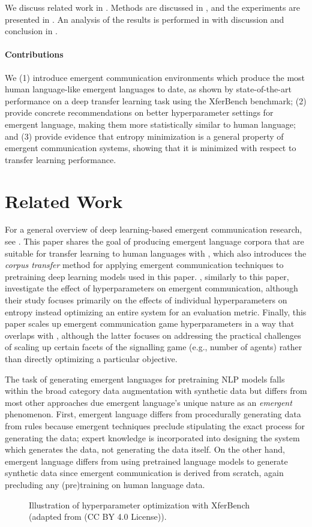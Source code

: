 We discuss related work in .
Methods are discussed in , and the experiments are presented in .
An analysis of the results is performed in  with discussion and conclusion in .

\paragraph{Contributions}

We (1) introduce emergent communication environments which produce the most human language-like emergent languages to date, as shown by state-of-the-art performance on a deep transfer learning task using the XferBench benchmark;
(2) provide concrete recommendations on better hyperparameter settings for emergent language, making them more statistically similar to human language; and
(3) provide evidence that entropy minimization is a general property of emergent communication systems, showing that it is minimized with respect to transfer learning performance.


\section{Related Work}
\unskip\label{hpo:sec:related-work}
For a general overview of deep learning-based emergent communication research, see \citet{lazaridou2020emergentmultiagentcommunicationdeep}.
This paper shares the goal of producing emergent language corpora that are suitable for transfer learning to human languages with \citet{yao2022linking}, which also introduces the \emph{corpus transfer} method for applying emergent communication techniques to pretraining deep learning models used in this paper.
\citet{boldt2023mathmodel}, similarly to this paper, investigate the effect of hyperparameters on emergent communication, although their study focuses primarily on the effects of individual hyperparameters on entropy instead optimizing an entire system for an evaluation metric.
Finally, this paper scales up emergent communication game hyperparameters in a way that overlaps with \citet{chaabouni2022emergent}, although the latter focuses on addressing the practical challenges of scaling up certain facets of the signalling game (e.g., number of agents) rather than directly optimizing a particular objective.

The task of generating emergent languages for pretraining NLP models falls within the broad category data augmentation with synthetic data  but differs from most other approaches due emergent language's unique nature as an \emph{emergent} phenomenon.
First, emergent language differs from procedurally generating data from rules because emergent techniques preclude stipulating the exact process for generating the data; expert knowledge is incorporated into designing the system which generates the data, not generating the data itself.
On the other hand, emergent language differs from using pretrained language models to generate synthetic data since emergent communication is derived from scratch, again precluding any (pre)training on human language data.

\begin{figure*}
  \centering
  \caption{Illustration of hyperparameter optimization with XferBench (adapted from \citet{boldt-mortensen-2024-xferbench} (CC BY 4.0 License)).}
  \unskip\label{hpo:fig:xb}
\end{figure*}


